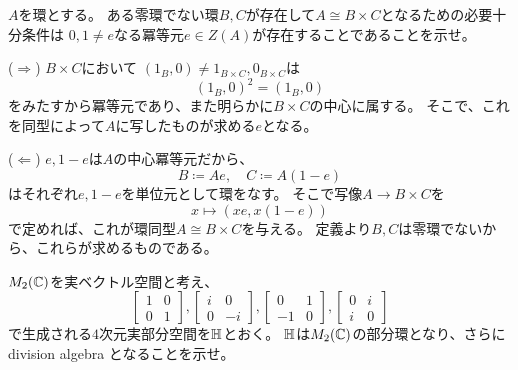 \documentclass[report]{jlreq}
\begin{document}


\begin{problem}[代数学II 1.11]
    $A$を環とする。
    ある零環でない環$B, C$が存在して$A \cong B \times C$となるための必要十分条件は
    $0, 1 \neq e$なる冪等元$e \in Z(A)$が存在することであることを示せ。
\end{problem}

\begin{answer}
    ($\Rightarrow$) \quad
    $B \times C$において
    $(1_B, 0) \neq 1_{B \times C}, 0_{B \times C}$は
    \begin{equation}
        (1_B, 0)^2 = (1_B, 0)
    \end{equation}
    をみたすから冪等元であり、また明らかに$B \times C$の中心に属する。
    そこで、これを同型によって$A$に写したものが求める$e$となる。

    ($\Leftarrow$) \quad
    $e, 1 - e$は$A$の中心冪等元だから、
    \begin{equation}
        B \coloneqq A e, \quad
        C \coloneqq A (1 - e)
    \end{equation}
    はそれぞれ$e, 1 - e$を単位元として環をなす。
    そこで写像$A \to B \times C$を
    \begin{equation}
        x \mapsto (xe, x(1 - e))
    \end{equation}
    で定めれば、これが環同型$A \cong B \times C$を与える。
    定義より$B, C$は零環でないから、これらが求めるものである。
\end{answer}


\begin{problem}
    $M_2(\mathbb{C})$を実ベクトル空間と考え、
    \begin{equation}
        \begin{bmatrix}
            1 & 0 \\
            0 & 1
        \end{bmatrix},
        \begin{bmatrix}
            i & 0 \\
            0 & -i
        \end{bmatrix},
        \begin{bmatrix}
            0 & 1 \\
            -1 & 0
        \end{bmatrix},
        \begin{bmatrix}
            0 & i \\
            i & 0
        \end{bmatrix}
    \end{equation}
    で生成される$4$次元実部分空間を$\mathbb{H}$とおく。
    $\mathbb{H}$は$M_2(\mathbb{C})$の部分環となり、さらに division algebra となることを示せ。
\end{problem}
\end{document}

